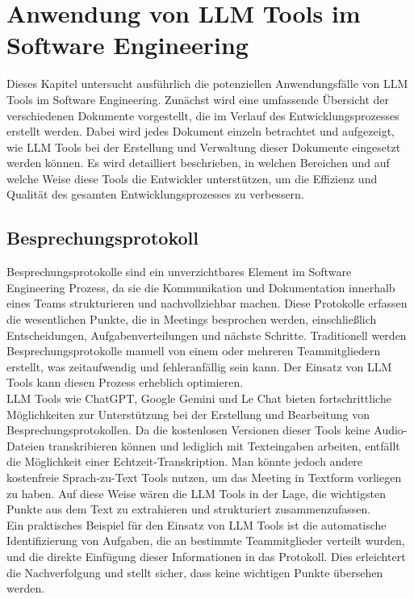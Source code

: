 \chapter{Anwendung von LLM Tools im Software Engineering} 

Dieses Kapitel untersucht ausführlich die potenziellen Anwendungsfälle von LLM Tools im Software Engineering. 
Zunächst wird eine umfassende Übersicht der verschiedenen Dokumente vorgestellt, die im Verlauf des 
Entwicklungsprozesses erstellt werden. Dabei wird jedes Dokument einzeln betrachtet und aufgezeigt, wie 
LLM Tools bei der Erstellung und Verwaltung dieser Dokumente eingesetzt werden können. Es wird detailliert 
beschrieben, in welchen Bereichen und auf welche Weise diese Tools die Entwickler unterstützen, um die 
Effizienz und Qualität des gesamten Entwicklungsprozesses zu verbessern.

\section{Besprechungsprotokoll}  \label{Besprechungsprotokoll}

Besprechungsprotokolle sind ein unverzichtbares Element im Software Engineering Prozess, da sie die Kommunikation 
und Dokumentation innerhalb eines Teams strukturieren und nachvollziehbar machen. Diese Protokolle erfassen die 
wesentlichen Punkte, die in Meetings besprochen werden, einschließlich Entscheidungen, Aufgabenverteilungen und 
nächste Schritte. Traditionell werden Besprechungsprotokolle manuell von einem oder mehreren Teammitgliedern erstellt, 
was zeitaufwendig und fehleranfällig sein kann. Der Einsatz von LLM Tools kann diesen Prozess erheblich optimieren.\\

LLM Tools wie ChatGPT, Google Gemini und Le Chat bieten fortschrittliche Möglichkeiten zur Unterstützung bei der Erstellung 
und Bearbeitung von Besprechungsprotokollen. Da die kostenlosen Versionen dieser Tools keine Audio-Dateien transkribieren 
können und lediglich mit Texteingaben arbeiten, entfällt die Möglichkeit einer Echtzeit-Transkription. Man könnte jedoch 
andere kostenfreie Sprach-zu-Text Tools nutzen, um das Meeting in Textform vorliegen zu haben. Auf diese Weise wären die LLM 
Tools in der Lage, die wichtigsten Punkte aus dem Text zu extrahieren und strukturiert zusammenzufassen.\\

Ein praktisches Beispiel für den Einsatz von LLM Tools ist die automatische Identifizierung von Aufgaben, die an bestimmte 
Teammitglieder verteilt wurden, und die direkte Einfügung dieser Informationen in das Protokoll. Dies erleichtert die 
Nachverfolgung und stellt sicher, dass keine wichtigen Punkte übersehen werden.\\


